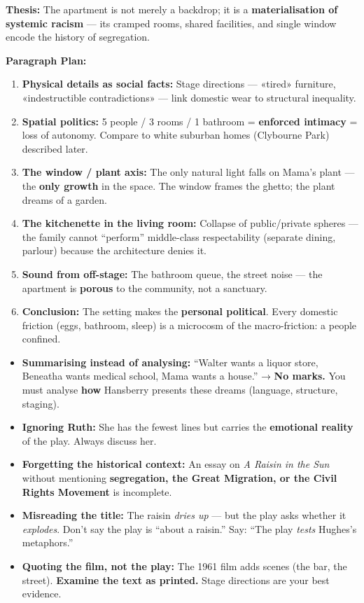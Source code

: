 \documentclass[11pt]{article}
\begin{document}
\begin{corrige}
\textbf{Thesis:} The apartment is not merely a backdrop; it is a \textbf{materialisation of systemic racism} — its cramped rooms, shared facilities, and single window encode the history of segregation.

\textbf{Paragraph Plan:}
\begin{enumerate}
\item \textbf{Physical details as social facts:} Stage directions — «tired» furniture, «indestructible contradictions» — link domestic wear to structural inequality.
\item \textbf{Spatial politics:} 5 people / 3 rooms / 1 bathroom = \textbf{enforced intimacy} = loss of autonomy. Compare to white suburban homes (Clybourne Park) described later.
\item \textbf{The window / plant axis:} The only natural light falls on Mama's plant — the \textbf{only growth} in the space. The window frames the ghetto; the plant dreams of a garden.
\item \textbf{The kitchenette in the living room:} Collapse of public/private spheres — the family cannot ``perform'' middle-class respectability (separate dining, parlour) because the architecture denies it.
\item \textbf{Sound from off-stage:} The bathroom queue, the street noise — the apartment is \textbf{porous} to the community, not a sanctuary.
\item \textbf{Conclusion:} The setting makes the \textbf{personal political}. Every domestic friction (eggs, bathroom, sleep) is a microcosm of the macro-friction: a people confined.
\end{enumerate}
\end{corrige}

\begin{attention}
\begin{itemize}
\item \textbf{Summarising instead of analysing:} ``Walter wants a liquor store, Beneatha wants medical school, Mama wants a house.'' → \textbf{No marks.} You must analyse \textbf{how} Hansberry presents these dreams (language, structure, staging).
\item \textbf{Ignoring Ruth:} She has the fewest lines but carries the \textbf{emotional reality} of the play. Always discuss her.
\item \textbf{Forgetting the historical context:} An essay on \emph{A Raisin in the Sun} without mentioning \textbf{segregation, the Great Migration, or the Civil Rights Movement} is incomplete.
\item \textbf{Misreading the title:} The raisin \emph{dries up} — but the play asks whether it \emph{explodes}. Don't say the play is ``about a raisin.'' Say: ``The play \emph{tests} Hughes's metaphors.''
\item \textbf{Quoting the film, not the play:} The 1961 film adds scenes (the bar, the street). \textbf{Examine the text as printed.} Stage directions are your best evidence.
\end{itemize}
\end{attention}
\end{document}
